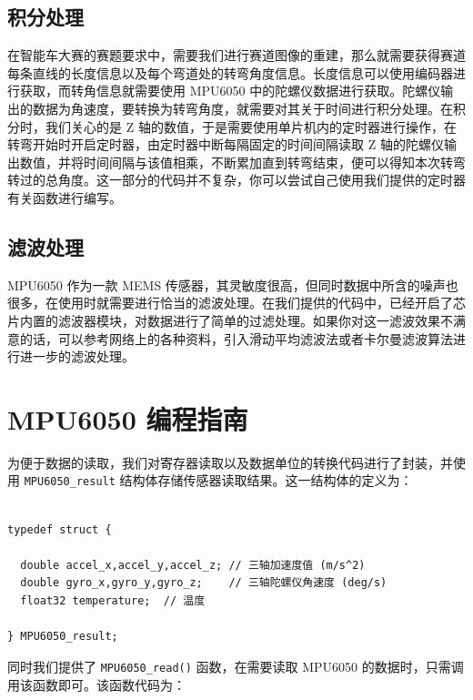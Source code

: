\subsection{积分处理}
在智能车大赛的赛题要求中，需要我们进行赛道图像的重建，那么就需要获得赛道每条直线的长度信息以及每个弯道处的转弯角度信息。长度信息可以使用编码器进行获取，而转角信息就需要使用 MPU6050 中的陀螺仪数据进行获取。陀螺仪输出的数据为角速度，要转换为转弯角度，就需要对其关于时间进行积分处理。在积分时，我们关心的是 Z 轴的数值，于是需要使用单片机内的定时器进行操作，在转弯开始时开启定时器，由定时器中断每隔固定的时间间隔读取 Z 轴的陀螺仪输出数值，并将时间间隔与该值相乘，不断累加直到转弯结束，便可以得知本次转弯转过的总角度。这一部分的代码并不复杂，你可以尝试自己使用我们提供的定时器有关函数进行编写。

\subsection{滤波处理}
MPU6050 作为一款 MEMS 传感器，其灵敏度很高，但同时数据中所含的噪声也很多，在使用时就需要进行恰当的滤波处理。在我们提供的代码中，已经开启了芯片内置的滤波器模块，对数据进行了简单的过滤处理。如果你对这一滤波效果不满意的话，可以参考网络上的各种资料，引入滑动平均滤波法或者卡尔曼滤波算法进行进一步的滤波处理。

\section{MPU6050 编程指南}
为便于数据的读取，我们对寄存器读取以及数据单位的转换代码进行了封装，并使用 \lstinline{MPU6050_result} 结构体存储传感器读取结果。这一结构体的定义为：

\begin{verbatim}

typedef struct {

  double accel_x,accel_y,accel_z; // 三轴加速度值 (m/s^2)
  double gyro_x,gyro_y,gyro_z;    // 三轴陀螺仪角速度 (deg/s)
  float32 temperature;  // 温度

} MPU6050_result;

\end{verbatim}

同时我们提供了 \lstinline{MPU6050_read()} 函数，在需要读取 MPU6050 的数据时，只需调用该函数即可。该函数代码为：

